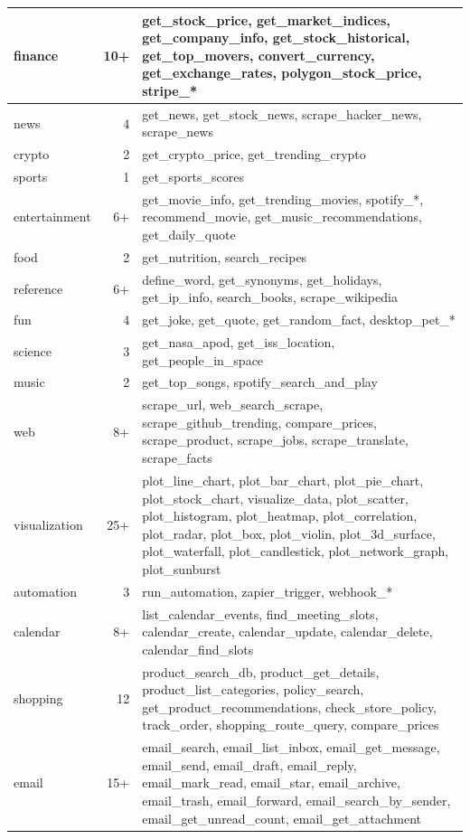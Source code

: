 \documentclass[12pt,a4paper,twoside]{report}
\begin{document}
\begin{table}[H]
\begin{tabularx}{\textwidth}{|l|r|X|}
\hline
finance & 10+ & get\_stock\_price, get\_market\_indices, get\_company\_info, get\_stock\_historical, get\_top\_movers, convert\_currency, get\_exchange\_rates, polygon\_stock\_price, stripe\_* \\
\hline
news & 4 & get\_news, get\_stock\_news, scrape\_hacker\_news, scrape\_news \\
\hline
crypto & 2 & get\_crypto\_price, get\_trending\_crypto \\
\hline
sports & 1 & get\_sports\_scores \\
\hline
entertainment & 6+ & get\_movie\_info, get\_trending\_movies, spotify\_*, recommend\_movie, get\_music\_recommendations, get\_daily\_quote \\
\hline
food & 2 & get\_nutrition, search\_recipes \\
\hline
reference & 6+ & define\_word, get\_synonyms, get\_holidays, get\_ip\_info, search\_books, scrape\_wikipedia \\
\hline
fun & 4 & get\_joke, get\_quote, get\_random\_fact, desktop\_pet\_* \\
\hline
science & 3 & get\_nasa\_apod, get\_iss\_location, get\_people\_in\_space \\
\hline
music & 2 & get\_top\_songs, spotify\_search\_and\_play \\
\hline
web & 8+ & scrape\_url, web\_search\_scrape, scrape\_github\_trending, compare\_prices, scrape\_product, scrape\_jobs, scrape\_translate, scrape\_facts \\
\hline
visualization & 25+ & plot\_line\_chart, plot\_bar\_chart, plot\_pie\_chart, plot\_stock\_chart, visualize\_data, plot\_scatter, plot\_histogram, plot\_heatmap, plot\_correlation, plot\_radar, plot\_box, plot\_violin, plot\_3d\_surface, plot\_waterfall, plot\_candlestick, plot\_network\_graph, plot\_sunburst \\
\hline
automation & 3 & run\_automation, zapier\_trigger, webhook\_* \\
\hline
calendar & 8+ & list\_calendar\_events, find\_meeting\_slots, calendar\_create, calendar\_update, calendar\_delete, calendar\_find\_slots \\
\hline
shopping & 12 & product\_search\_db, product\_get\_details, product\_list\_categories, policy\_search, get\_product\_recommendations, check\_store\_policy, track\_order, shopping\_route\_query, compare\_prices \\
\hline
email & 15+ & email\_search, email\_list\_inbox, email\_get\_message, email\_send, email\_draft, email\_reply, email\_mark\_read, email\_star, email\_archive, email\_trash, email\_forward, email\_search\_by\_sender, email\_get\_unread\_count, email\_get\_attachment \\

\end{tabularx}
\end{table}
\end{document}
